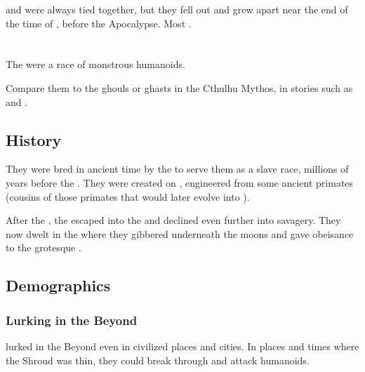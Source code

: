 \Cuezcans{} and \nycans{} were always tied together, but they fell out and grew apart near the end of the time of \Cuezca, before the Apocalypse. 
Most \nycans{} . 















\section{\Glithids}
\index{\glithid}
The \glithids were a race of monstrous humanoids. 

Compare them to the ghouls or ghasts in the Cthulhu Mythos, in stories such as \cite{HPLovecraft:PickmansModel} and \cite{HPLovecraft:TheDreamQuestofUnknownKadath}.









\subsection{History}
They were bred in ancient time by the  to serve them as a slave race, millions of years before the \banewars. 
They were created on \Miith, engineered from some ancient primates (cousins of those primates that would later evolve into \nephilim). 

After the , the \glithids escaped into the \wylde and declined even further into savagery.
They now dwelt in the \wylde where they gibbered underneath the moons and gave obeisance to the grotesque . 









\subsection{Demographics}





\subsubsection{Lurking in the Beyond}
\Glithids lurked in the Beyond even in civilized places and cities. 
In places and times where the Shroud was thin, they could break through and attack humanoids.

